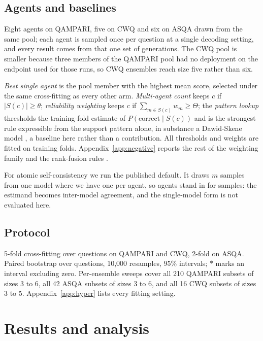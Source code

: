 \documentclass{article}
\begin{document}
\subsection{Agents and baselines}

Eight agents on QAMPARI, five on CWQ and six on ASQA drawn from the same pool; each agent is sampled once per question at a single decoding setting, and every result comes from that one set of generations. The CWQ pool is smaller because three members of the QAMPARI pool had no deployment on the endpoint used for those runs, so CWQ ensembles reach size five rather than six.

\emph{Best single agent} is the pool member with the highest mean score, selected under the same cross-fitting as every other arm. \emph{Multi-agent count} keeps $c$ if $|S(c)| \geq \theta$; \emph{reliability weighting} keeps $c$ if $\sum_{m \in S(c)} w_m \geq \Theta$; the \emph{pattern lookup} thresholds the training-fold estimate of $P(\mathrm{correct} \mid S(c))$ and is the strongest rule expressible from the support pattern alone, in substance a Dawid-Skene model \cite{dawid1979maximum}, a baseline here rather than a contribution. All thresholds and weights are fitted on training folds. Appendix~\ref{app:negative} reports the rest of the weighting family and the rank-fusion rules \cite{cormack2009reciprocal}.

For atomic self-consistency \cite{thirukovalluru2024atomic} we run the published default. It draws $m$ samples from one model where we have one per agent, so agents stand in for samples: the estimand becomes inter-model agreement, and the single-model form is not evaluated here.

\subsection{Protocol}
\label{sec:protocol}
\label{sec:crossfit}

5-fold cross-fitting over questions on QAMPARI and CWQ, 2-fold on ASQA. Paired bootstrap over questions, 10,000 resamples, $95\%$ intervals; $*$ marks an interval excluding zero. Per-ensemble sweeps cover all 210 QAMPARI subsets of sizes 3 to 6, all 42 ASQA subsets of sizes 3 to 6, and all 16 CWQ subsets of sizes 3 to 5. Appendix~\ref{app:hyper} lists every fitting setting.

\section{Results and analysis}
\label{sec:results}
\end{document}
